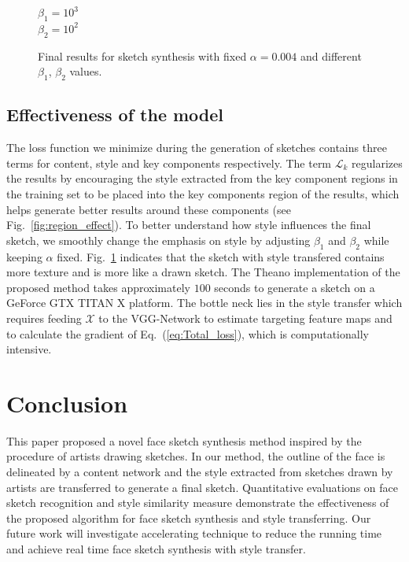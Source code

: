 \documentclass[10pt,twocolumn,letterpaper]{article}
\begin{document}
\begin{figure}[htbp]
\begin{minipage}[t]{0.16\linewidth}
$\beta_1  = 10^{3} $\\
$\beta_2  = 10^{2} $
\end{minipage}
\caption{Final results for sketch synthesis with fixed $\alpha=0.004$ and different $\beta_1$, $\beta_2$ values.}
\label{fig:alphg_effect}
\end{figure}

\subsection{Effectiveness of the model}

The loss function we minimize during the generation of sketches contains three terms for content, style and key components respectively. The term $\mathcal{L}_{k} $ regularizes the results by encouraging the style extracted from the key component regions in the training set to be placed into the key components region of the results, which helps generate better results around these components (see Fig.~\ref{fig:region_effect}). To better understand how style influences the final sketch, we smoothly change the emphasis on style by adjusting $\beta_1$ and $\beta_2$ while keeping $\alpha$  fixed. Fig.~\ref{fig:alphg_effect} indicates that the sketch with style transfered contains more texture and is more like a drawn sketch. The Theano implementation of the proposed method takes approximately $100$ seconds to generate a sketch on a GeForce GTX TITAN X platform. The bottle neck lies in the style transfer which requires feeding $\mathcal{X}$ to the VGG-Network to estimate targeting feature maps and to calculate the gradient of Eq.~(\ref{eq:Total_loss}), which is computationally intensive. 

\section{Conclusion}

This paper proposed a novel face sketch synthesis method inspired by the procedure of artists drawing sketches. In our method, the outline of the face is delineated by a content network and the style extracted from sketches drawn by artists are transferred to generate a final sketch. Quantitative evaluations on face sketch recognition and style similarity measure demonstrate the effectiveness of the proposed algorithm for face sketch synthesis and style transferring. Our future work will investigate accelerating technique to reduce the running time and achieve real time face sketch synthesis with style transfer.


{\small


}
\end{document}
